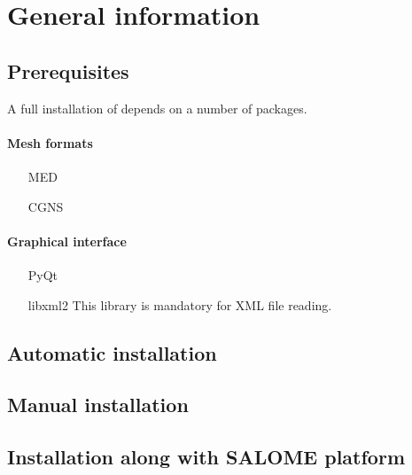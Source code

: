 \documentclass[a4paper,10pt,twoside]{report}
\begin{document}
\def\contentsname{\textbf{\normalsize TABLE OF CONTENTS}\pdfbookmark[1]{Table of
contents}{contents}}

\large
\makepdgCS
\normalsize

\passepage

\begin{center}\begin{singlespace}
\tableofcontents
\end{singlespace}\end{center}
%
\chapter{General information}
%
\section{Prerequisites}

A full installation of \CS depends on a number of packages.

\subsubsection{Mesh formats}
\begin{itemize}
\item[MED]
\item[CGNS]
\end{itemize}

\subsubsection{Graphical interface}

\begin{itemize}
\item[PyQt] 
\item[libxml2] This library is mandatory for XML file reading.
\end{itemize}
%
\section{Automatic installation}
%
\section{Manual installation}

\section{Installation along with SALOME platform}
\end{document}
